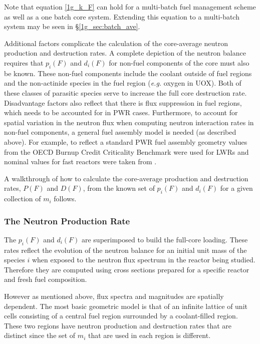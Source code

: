 Note that equation \ref{1g_k_F} can hold for a multi-batch fuel management scheme as well as a one batch core 
system.  Extending this equation to a multi-batch system may be seen in \S \ref{1g_sec:batch_ave}.

Additional factors complicate the calculation of the core-average neutron production and destruction rates.  
A complete depiction of the neutron balance requires that $p_i(F)$ and $d_i(F)$ for non-fuel components of 
the core must also be known.  These non-fuel components include the coolant outside of fuel regions and the 
non-actinide species in the fuel region (\emph{e.g.} oxygen in UOX).  Both of these classes of parasitic 
species serve to increase the full core destruction rate.  Disadvantage factors also reflect that there is flux 
suppression in fuel regions, which needs to be accounted for in PWR cases.  Furthermore, to 
account for spatial variation in the neutron flux when computing neutron interaction rates in non-fuel 
components, a general fuel assembly model is needed (as described above).  For example, to reflect a 
standard PWR fuel assembly geometry values from the OECD Burnup Credit Criticality Benchmark \cite{Takano1994} 
were used for LWRs and nominal values for fast reactors were taken from \cite{INL/CON-07-12478}.  

A walkthrough of how to calculate the core-average production and destruction rates, $P(F)$ and $D(F)$, 
from the known set of $p_i(F)$ and $d_i(F)$ for a given collection of $m_i$ follows.  




\subsubsection{The Neutron Production Rate}
\label{1g_sec:p_rate}
The $p_i(F)$ and $d_i(F)$ are superimposed to build the full-core loading.  These rates reflect the 
evolution of the neutron balance for an initial unit mass of the species $i$ when exposed to the 
neutron flux spectrum in the reactor being studied.  Therefore they are computed using cross 
sections prepared for a specific reactor and fresh fuel composition.

However as mentioned above, flux spectra and magnitudes are spatially dependent.  The most basic geometric 
model is that of an infinite lattice of unit cells consisting of a central fuel region 
surrounded by a coolant-filled region.  These two regions have neutron production and destruction rates that 
are distinct since the set of $m_i$ that are used in each region is different.  

